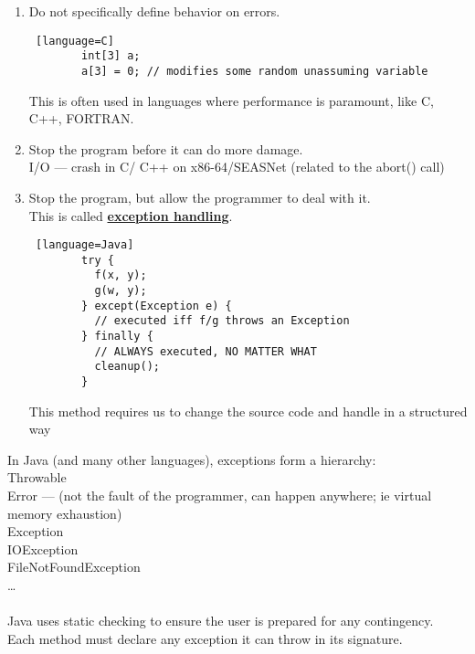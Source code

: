 \documentclass[../../lecture_notes.tex]{subfiles}
\begin{document}
\begin{enumerate}
		Most machines use it as in the method of ‘floats’:
		\begin{lstlisting} [language=Java]
		double a = 127;
		double b = 0;
		double c = a/b; // returns infinite (in Java)
		double d = c + 7; // sets d to infinity
		\end{lstlisting}
		This is great because it is safe and thus very popular!
	\item Do not specifically define behavior on errors.\\
		\begin{lstlisting} [language=C]
		int[3] a;
		a[3] = 0; // modifies some random unassuming variable
		\end{lstlisting}
		This is often used in languages where performance is paramount, like C, C++, FORTRAN.
	\item Stop the program before it can do more damage.\\
		I/O — crash in C/ C++ on x86-64/SEASNet (related to the abort() call)
	\item Stop the program, but allow the programmer to deal with it.\\
		This is called \textbf{\underline{exception handling}}.
		\begin{lstlisting} [language=Java]
		try {
		  f(x, y);
		  g(w, y);
		} except(Exception e) {
		  // executed iff f/g throws an Exception
		} finally {
		  // ALWAYS executed, NO MATTER WHAT
		  cleanup();
		}
		\end{lstlisting}
		This method requires us to change the source code and handle in a structured way
\end{enumerate}

\noindent In Java (and many other languages), exceptions form a hierarchy:\\
\indent Throwable\\
\indent \indent Error — (not the fault of the programmer, can happen anywhere; ie virtual memory exhaustion)\\
\indent \indent Exception\\
\indent \indent \indent IOException\\
\indent \indent \indent FileNotFoundException\\
\indent \indent \indent …\\
\\
Java uses static checking to ensure the user is prepared for any contingency.\\
Each method must declare any exception it can throw in its signature.\\
\end{document}
